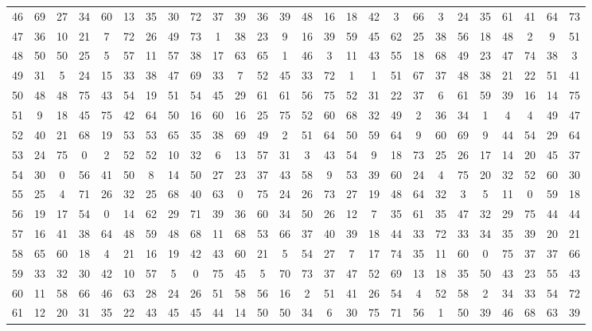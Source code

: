 \begin{table}
\begin{tabular}{c c c c c c c c c c c c c c c c c c c c c c c c c c }
46 & 69 & 27 & 34 & 60 & 13 & 35 & 30 & 72 & 37 & 39 & 36 & 39 & 48 & 16 & 18 & 42 & 3 & 66 & 3 & 24 & 35 & 61 & 41 & 64 & 73 \\
47 & 36 & 10 & 21 & 7 & 72 & 26 & 49 & 73 & 1 & 38 & 23 & 9 & 16 & 39 & 59 & 45 & 62 & 25 & 38 & 56 & 18 & 48 & 2 & 9 & 51 \\
48 & 50 & 50 & 25 & 5 & 57 & 11 & 57 & 38 & 17 & 63 & 65 & 1 & 46 & 3 & 11 & 43 & 55 & 18 & 68 & 49 & 23 & 47 & 74 & 38 & 3 \\
49 & 31 & 5 & 24 & 15 & 33 & 38 & 47 & 69 & 33 & 7 & 52 & 45 & 33 & 72 & 1 & 1 & 51 & 67 & 37 & 48 & 38 & 21 & 22 & 51 & 41 \\
50 & 48 & 48 & 75 & 43 & 54 & 19 & 51 & 54 & 45 & 29 & 61 & 61 & 56 & 75 & 52 & 31 & 22 & 37 & 6 & 61 & 59 & 39 & 16 & 14 & 75 \\
51 & 9 & 18 & 45 & 75 & 42 & 64 & 50 & 16 & 60 & 16 & 25 & 75 & 52 & 60 & 68 & 32 & 49 & 2 & 36 & 34 & 1 & 4 & 4 & 49 & 47 \\
52 & 40 & 21 & 68 & 19 & 53 & 53 & 65 & 35 & 38 & 69 & 49 & 2 & 51 & 64 & 50 & 59 & 64 & 9 & 60 & 69 & 9 & 44 & 54 & 29 & 64 \\
53 & 24 & 75 & 0 & 2 & 52 & 52 & 10 & 32 & 6 & 13 & 57 & 31 & 3 & 43 & 54 & 9 & 18 & 73 & 25 & 26 & 17 & 14 & 20 & 45 & 37 \\
54 & 30 & 0 & 56 & 41 & 50 & 8 & 14 & 50 & 27 & 23 & 37 & 43 & 58 & 9 & 53 & 39 & 60 & 24 & 4 & 75 & 20 & 32 & 52 & 60 & 30 \\
55 & 25 & 4 & 71 & 26 & 32 & 25 & 68 & 40 & 63 & 0 & 75 & 24 & 26 & 73 & 27 & 19 & 48 & 64 & 32 & 3 & 5 & 11 & 0 & 59 & 18 \\
56 & 19 & 17 & 54 & 0 & 14 & 62 & 29 & 71 & 39 & 36 & 60 & 34 & 50 & 26 & 12 & 7 & 35 & 61 & 35 & 47 & 32 & 29 & 75 & 44 & 44 \\
57 & 16 & 41 & 38 & 64 & 48 & 59 & 48 & 68 & 11 & 68 & 53 & 66 & 37 & 40 & 39 & 18 & 44 & 33 & 72 & 33 & 34 & 35 & 39 & 20 & 21 \\
58 & 65 & 60 & 18 & 4 & 21 & 16 & 19 & 42 & 43 & 60 & 21 & 5 & 54 & 27 & 7 & 17 & 74 & 35 & 11 & 60 & 0 & 75 & 37 & 37 & 66 \\
59 & 33 & 32 & 30 & 42 & 10 & 57 & 5 & 0 & 75 & 45 & 5 & 70 & 73 & 37 & 47 & 52 & 69 & 13 & 18 & 35 & 50 & 43 & 23 & 55 & 43 \\
60 & 11 & 58 & 66 & 46 & 63 & 28 & 24 & 26 & 51 & 58 & 56 & 16 & 2 & 51 & 41 & 26 & 54 & 4 & 52 & 58 & 2 & 34 & 33 & 54 & 72 \\
61 & 12 & 20 & 31 & 35 & 22 & 43 & 45 & 45 & 44 & 14 & 50 & 50 & 34 & 6 & 30 & 75 & 71 & 56 & 1 & 50 & 39 & 46 & 68 & 63 & 39 \\

\end{tabular}
\end{table}
